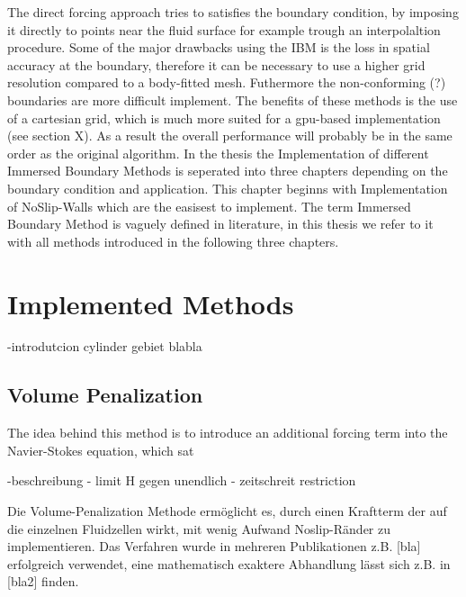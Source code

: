 The direct forcing approach tries to satisfies the boundary condition, by imposing it directly to points near the fluid surface for example
trough an interpolaltion procedure.
Some of the major drawbacks using the IBM is the loss in  spatial accuracy at the boundary, therefore it can be necessary to use a higher grid resolution
compared to a body-fitted mesh.  Futhermore the non-conforming (?) boundaries are more difficult implement.
The benefits of these methods is the use of a cartesian grid, which is much more suited for a gpu-based implementation (see section X).
As a result the overall performance will probably be in the same order as the original algorithm.
In the thesis the Implementation of different Immersed Boundary Methods is seperated into three chapters depending on the boundary condition and application.
This chapter beginns with Implementation of NoSlip-Walls which are the easisest to implement.
The term Immersed Boundary Method is vaguely defined in literature, in this thesis we refer to it with all methods introduced in the following three chapters.


\newpage

\section{Implemented Methods}

-introdutcion cylinder gebiet blabla

\subsection{Volume Penalization}

The idea behind this method is to introduce an additional forcing term into the Navier-Stokes equation, which sat


-beschreibung
- limit H gegen unendlich
- zeitschreit restriction




Die Volume-Penalization Methode ermöglicht es, durch einen Kraftterm der auf die einzelnen Fluidzellen wirkt, mit wenig Aufwand Noslip-Ränder zu implementieren.
Das Verfahren wurde in mehreren Publikationen z.B. [bla] erfolgreich verwendet, eine mathematisch exaktere Abhandlung lässt sich z.B. in [bla2] finden.

